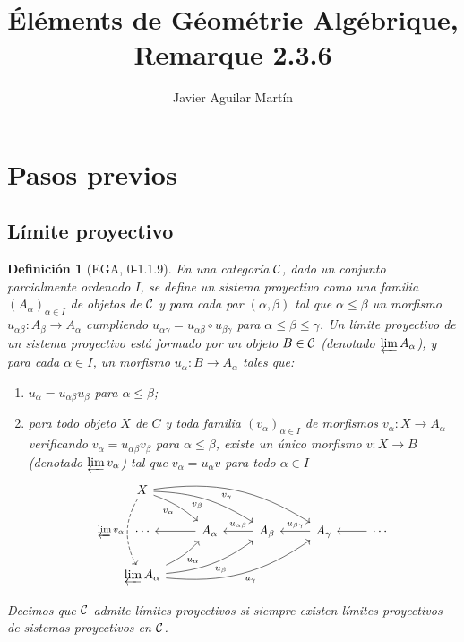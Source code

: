 \documentclass[twoside]{article}
\newtheorem{defin}{Definición}[section]
\begin{document}
\title{Éléments de Géométrie Algébrique, Remarque 2.3.6}
\author{Javier Aguilar Martín}
\maketitle

\section{Pasos previos}

\subsection{Límite proyectivo}

\begin{defin}[EGA, 0-1.1.9]
En una categoría ${\mathcal C}$, dado un conjunto parcialmente ordenado $I$, se define un \emph{sistema proyectivo} como una familia $(A_\alpha)_{\alpha\in I}$ de objetos de ${\mathcal C}$ y para cada par $(\alpha,\beta)$ tal que $\alpha\leq\beta$ un morfismo $u_{\alpha\beta}:A_\beta\to A_\alpha$ cumpliendo $u_{\alpha\gamma}=u_{\alpha\beta}\circ u_{\beta\gamma}$ para $\alpha\leq\beta\leq\gamma$. Un \emph{límite proyectivo} de un sistema proyectivo está formado por un objeto $B\in{\mathcal C}$ (denotado $\varprojlim A_\alpha$), y para cada $\alpha\in I$, un morfismo $u_\alpha:B\to A_\alpha$ tales que: 
\begin{enumerate}
\item $u_\alpha=u_{\alpha\beta}u_{\beta}$ para $\alpha\leq\beta$;
\item para todo objeto $X$ de $C$ y toda familia $(v_\alpha)_{\alpha\in I}$ de morfismos $v_\alpha:X\to A_{\alpha}$ verificando $v_\alpha=u_{\alpha\beta}v_{\beta}$ para $\alpha\leq\beta$, existe un único morfismo $v:X\to B$ (denotado $\varprojlim v_\alpha$) tal que $v_\alpha=u_\alpha v$ para todo $\alpha\in I$
\[
\begin{tikzcd}
X\arrow[drrr, bend left=20, "v_\gamma"']\arrow[drr, bend left=15, "v_\beta"']\arrow[dr, bend left=10, "v_\alpha"']\arrow[dd, dashed, bend right, "\varprojlim v_\alpha"']& & & & \\
\cdots &A_\alpha\arrow[l]  & A_\beta\arrow[l, "u_{\alpha\beta}"']  & \arrow[l, "u_{\beta\gamma}"']A_\gamma &\cdots\arrow[l]\\
\varprojlim A_\alpha\arrow[urrr, bend left=-20, "u_\gamma"']\arrow[urr, bend left=-15, "u_\beta"']\arrow[ur, bend left=-10, "u_\alpha"']&  & & & 
\end{tikzcd}
\]
\end{enumerate}
Decimos que ${\mathcal C}$ \emph{admite límites proyectivos} si siempre existen límites proyectivos de sistemas proyectivos en ${\mathcal C}$. 
\end{defin}
\end{document}
